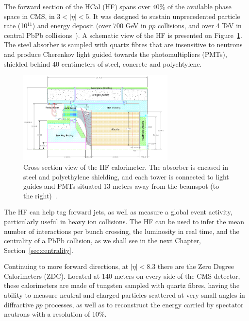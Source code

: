 The forward section of the HCal (HF) spans over 40\% of the available
phase space in CMS, in $3 < \vert\eta\vert < 5$. It was designed to sustain
unprecedented particle rate (10$^{11}$) and energy deposit (over 700
GeV in $pp$ collisions, and over 4 TeV in central PbPb
collisions~\cite{pbpbmult}). A schematic view of the HF is presented on
Figure~\ref{fig:HFpng}. The steel absorber is sampled with quartz
fibres that are insensitive to neutrons and produce Cherenkov light
guided towards the photomultipliers (PMTs), shielded behind 40
centimeters of steel, concrete and polyehtylene.


\begin{figure}[htb]
  \begin{center}
    \includegraphics[width=0.7\textwidth]{Chapters/xLHCMS/HF.png}
    \caption{Cross section view of the HF calorimeter. The absorber is
    encased in steel and polyethylene shielding, and each tower is
    connected to light guides and PMTs situated 13 meters away from
    the beamspot (to the right)~\cite{Chatrchyan:2008aa}.}
    \label{fig:HFpng}
  \end{center}
\end{figure}

The HF can help tag forward jets, as well as measure a global event
activity, particularly useful in heavy ion collisions. The HF can be
used to infer the mean number of interactions per bunch crossing, the
luminosity in real time, and the centrality of a PbPb collision, as we
shall see in the next Chapter, Section~\ref{sec:centrality}.


Continuing to more forward directions, at $\vert\eta\vert < 8.3$ there
are the
Zero Degree Calorimeters (ZDC). Located at 140 meters on every side of
the CMS detector, these calorimeters are made of tungsten sampled with
quartz fibres, having the ability to measure neutral and charged particles
scattered at very small angles in diffractive $pp$ processes, as well
as to reconstruct the energy carried by spectator neutrons with a
resolution of 10\%.


